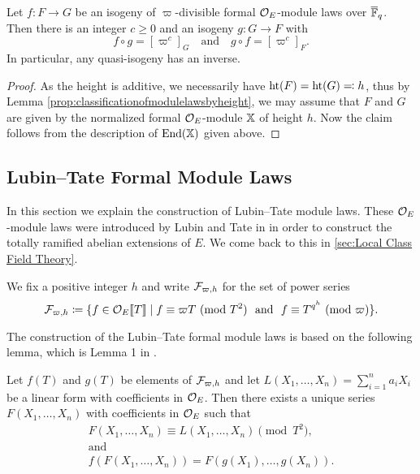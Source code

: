\documentclass[../main.tex]{subfiles}
\begin{document}
\begin{lem}\label{lem:inverseqisog}
  Let $f\colon  F \to G$ be an isogeny of $\varpi$-divisible formal
  $\mathcal{O}_E$-module laws over ${\overline {\mathbb{F}}_q}$. Then there is an 
  integer $c \geq 0$ and an isogeny $g\colon  G \to F$ with 
  \begin{equation*}
    f \circ g = [\varpi^c]_G \quad \text{and} \quad g \circ f = [\varpi^c]_F.
  \end{equation*}
  In particular, any quasi-isogeny has an inverse. 
  \begin{proof}[Proof]
    As the height is additive, we necessarily have 
    $\textnormal{ht}(F) = \textnormal{ht}(G) \eqcolon h$, thus by Lemma
    \ref{prop:classificationofmodulelawsbyheight}, we may assume that $F$ and
    $G$ are given by the normalized formal $\mathcal{O}_E$-module
    $\mathbb{X}$ of height $h$. Now the claim follows from the description of 
    $\operatorname{End}(\mathbb{X})$ given above. 
  \end{proof}
\end{lem}


\subsection{Lubin--Tate Formal Module Laws} %
\label{sub:Lubin--Tate Formal Module Laws}
In this section we explain the construction
of Lubin--Tate module laws. These $\mathcal{O}_E$-module laws were introduced by 
Lubin and Tate in \cite{LubinTateFormalMult} in order to
construct the totally ramified abelian extensions of $E$. We come back to this
in \cref{sec:Local Class Field Theory}.

We fix a positive integer $h$ and write $\mathcal{F}_{\varpi,h}$ for the set of power series
\begin{equation*}
  \cF_{\varpi,h} \coloneqq \{f \in \cO_E \llbr T \rrbr \mid f \equiv \varpi T
    \ (\text{mod } {T^2}) \ \text{ and } \ 
    f \equiv T^{q^h} \ (\text{mod }\varpi)\}. 
\end{equation*}

The construction of the Lubin--Tate formal module laws is based on the following 
lemma, which is Lemma 1 in \cite{LubinTateFormalMult}.
\begin{lem}\label{lem:LTLemma1}
  Let $f(T)$ and $g(T)$ be elements of $\mathcal{F}_{\varpi,h}$ and let 
  $L(X_1, \dots, X_n) = \sum_{i=1}^n a_i X_i$ be a linear form with coefficients in 
  ${\mathcal{O}_E}$. Then there exists a unique series $F(X_1, \dots, X_n)$ with coefficients 
  in ${\mathcal{O}_E}$ such that 
  \begin{gather*}
    F(X_1, \dots, X_n) \equiv L(X_1, \dots, X_n) \pmod {T^2}, \\ \text{and} \\
    f(F(X_1, \dots, X_n)) = F(g(X_1), \dots, g(X_n)).
  \end{gather*}
\end{lem}
\end{document}
